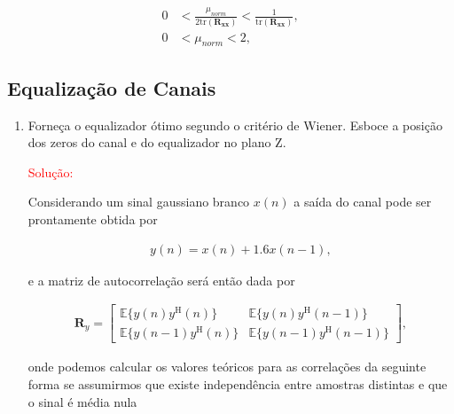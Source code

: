 \begin{align}
    0 &< \frac{\mu_{norm}}{2 \text{tr}(\mathbf{R_{xx}})} < \frac{1}{\text{tr}(\mathbf{R_{xx}})}, \\
    0 &< \mu_{norm} < 2, 
\end{align}
        
\clearpage


\subsection{Equalização de Canais} %

\begin{enumerate}
    
    \item Forneça o equalizador ótimo segundo o critério de Wiener. Esboce a posição dos zeros do canal e do equalizador no plano Z.
    
        \textcolor{red}{Solução:}
        
        Considerando um sinal gaussiano branco $x(n)$ a saída do canal pode ser prontamente obtida por
        
        \begin{align}
            y(n) = x(n) + 1.6 x(n - 1),
        \end{align}
        
        e a matriz de autocorrelação será então dada por
        
        \begin{align}
            \mathbf{R}_{y} =
            \begin{bmatrix}
                \mathbb{E}\{y(n)y^{\text{H}}(n)\} & \mathbb{E}\{y(n)y^{\text{H}}(n - 1)\} \\
                \mathbb{E}\{y(n - 1)y^{\text{H}}(n)\} & \mathbb{E}\{y(n - 1)y^{\text{H}}(n - 1)\}
            \end{bmatrix},
        \end{align}
        
        onde podemos calcular os valores teóricos para as correlações da seguinte forma se assumirmos que existe independência entre amostras distintas e que o sinal é média nula 
        

\end{enumerate}
